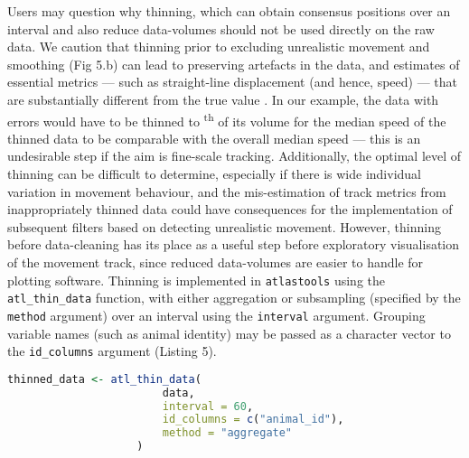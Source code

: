 \begin{refsection}
    Users may question why thinning, which can obtain consensus positions over an interval and also reduce data-volumes should not be used directly on the raw data.
    We caution that thinning prior to excluding unrealistic movement and smoothing (Fig 5.b) can lead to preserving artefacts in the data, and estimates of essential metrics --- such as straight-line displacement (and hence, speed) --- that are substantially different from the true value \citep[see Fig. 5.c;][]{noonan2019}.
    In our example, the data with errors would have to be thinned to \textsuperscript{th} of its volume for the median speed of the thinned data to be comparable with the overall median speed --- this is an undesirable step if the aim is fine-scale tracking.
    Additionally, the optimal level of thinning can be difficult to determine, especially if there is wide individual variation in movement behaviour, and the mis-estimation of track metrics from inappropriately thinned data could have consequences for the implementation of subsequent filters based on detecting unrealistic movement.
    However, thinning before data-cleaning has its place as a useful step before exploratory visualisation of the movement track, since reduced data-volumes are easier to handle for plotting software.
    Thinning is implemented in \texttt{atlastools} using the \texttt{atl\_thin\_data} function, with either aggregation or subsampling (specified by the \texttt{method} argument) over an interval using the \texttt{interval} argument.
    Grouping variable names (such as animal identity) may be passed as a character vector to the \texttt{id\_columns} argument (Listing 5).

    \begin{lstlisting}[float, language=R, style=customR, caption = {Code to thin data by aggregation in \texttt{atlastools}. The method can be either "aggregate" or "subsample". 
    The time interval is specified in seconds, while the \texttt{id\_columns} allows a character vector of column names to be passed to the function, with these columns used as identity variables.
    Both methods return a dataset with one rows per time-interval.}]
    thinned_data <- atl_thin_data(
                        data,
                        interval = 60,
                        id_columns = c("animal_id"),
                        method = "aggregate"
                    )
    \end{lstlisting}


\end{refsection}

